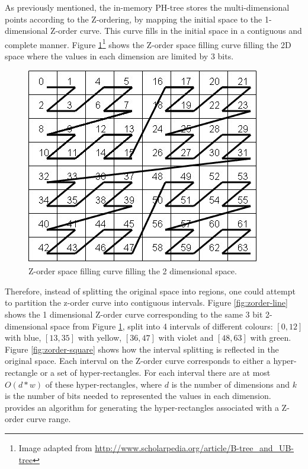\documentclass[11pt,a4paper]{globis-book}
\begin{document}
As previously mentioned, the in-memory PH-tree stores the multi-dimensional points according to the Z-ordering, by mapping the initial space to the 1-dimensional Z-order curve. This curve fills in the initial space in a contiguous and complete manner. Figure \ref{fig:zordering-clear}\footnote{Image adapted from \url{http://www.scholarpedia.org/article/B-tree_and_UB-tree}} shows the Z-order space filling curve filling the 2D space where the values in each dimension are limited by 3 bits.  

\begin{figure}[t]
    \centering
    \includegraphics[scale=0.8]{images/zordering-clear}
    \caption{Z-order space filling curve filling the 2 dimensional space.}
    \label{fig:zordering-clear}
\end{figure}

Therefore, instead of splitting the original space into regions, one could attempt to partition the z-order curve into contiguous intervals. Figure \ref{fig:zorder-line} shows the 1 dimensional Z-order curve corresponding to the same 3 bit 2-dimensional space from Figure \ref{fig:zordering-clear}, split into 4 intervals of different colours: $[{0, 12}]$ with blue, $[13, 35]$ with yellow, $[36, 47]$ with violet and $[48, 63]$ with green. Figure \ref{fig:zorder-square} shows how the interval splitting is reflected in the original space. Each interval on the Z-order curve corresponds to either a hyper-rectangle or a set of hyper-rectangles. For each interval there are at most $O(d*w)$ of these hyper-rectangles, where $d$ is the number of dimensions and $k$ is the number of bits needed to represented the values in each dimension. ~\cite{skopal2006-ubtree} provides an algorithm for generating the hyper-rectangles associated with a Z-order curve range.
\end{document}
